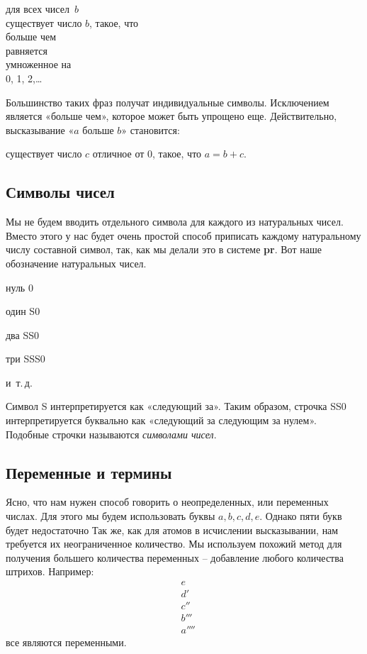 \documentclass[../main.tex]{subfiles}
\begin{document}
\begin{block}
    для всех чисел~$b$ \\
    существует число $b$, такое, что \\
    больше чем \\
    равняется \\
    умноженное на \\
    0, 1, 2,\ldots{}
\end{block}

Большинство таких фраз получат индивидуальные символы. Исключением является «больше чем», которое может быть упрощено еще. Действительно, высказывание «$a$ больше $b$» становится:

\begin{block}
    существует число $c$ отличное от 0, такое, что $a = b + c$.
\end{block}


\subsection{Символы чисел}

Мы не будем вводить отдельного символа для каждого из натуральных чисел. Вместо этого у нас будет очень простой способ приписать каждому натуральному числу составной символ, так, как мы делали это в системе \textbf{pr}. Вот наше обозначение натуральных чисел.

нуль 0

один S0

два SS0

три SSS0

и~т.\,д.

Символ S интерпретируется как «следующий за». Таким образом, строчка SS0 интерпретируется буквально как «следующий за следующим за нулем». Подобные строчки называются \emph{символами чисел}.


\subsection{Переменные и термины}

Ясно, что нам нужен способ говорить о неопределенных, или переменных числах. Для этого мы будем использовать буквы $a,b,c,d,e$. Однако пяти букв будет недостаточно Так же, как для атомов в исчислении высказывании, нам требуется их неограниченное количество. Мы используем похожий метод для получения большего количества переменных \--- добавление любого количества штрихов. Например:
\begin{align*}
    & e \\
    & d' \\
    & c'' \\
    & b''' \\
    & a''''
\end{align*}
все являются переменными.
\end{document}

